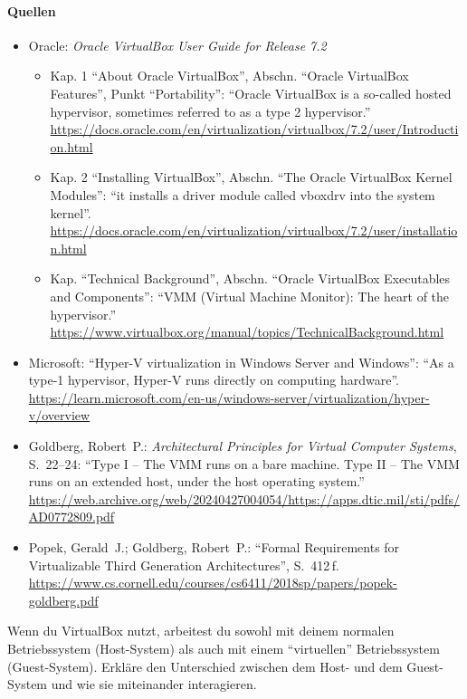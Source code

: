\paragraph{Quellen}
\begin{itemize}[quellen]
  \item Oracle: \emph{Oracle VirtualBox User Guide for Release 7.2}
  \begin{itemize}[nosep]
    \item Kap. 1 \enquote{About Oracle VirtualBox}, Abschn. \enquote{Oracle VirtualBox Features}, Punkt \enquote{Portability}: \enquote{Oracle VirtualBox is a so-called hosted hypervisor, sometimes referred to as a type 2 hypervisor.} \url{https://docs.oracle.com/en/virtualization/virtualbox/7.2/user/Introduction.html}
    \item Kap. 2 \enquote{Installing VirtualBox}, Abschn. \enquote{The Oracle VirtualBox Kernel Modules}: \enquote{it installs a driver module called vboxdrv into the system kernel}. \url{https://docs.oracle.com/en/virtualization/virtualbox/7.2/user/installation.html}
    \item Kap. \enquote{Technical Background}, Abschn. \enquote{Oracle VirtualBox Executables and Components}: \enquote{VMM (Virtual Machine Monitor): The heart of the hypervisor.} \url{https://www.virtualbox.org/manual/topics/TechnicalBackground.html}
  \end{itemize}
  \item Microsoft: \enquote{Hyper-V virtualization in Windows Server and Windows}: \enquote{As a type-1 hypervisor, Hyper-V runs directly on computing hardware}. \url{https://learn.microsoft.com/en-us/windows-server/virtualization/hyper-v/overview}
  \item Goldberg, Robert~P.: \emph{Architectural Principles for Virtual Computer Systems}, S.~22--24: \enquote{Type I -- The VMM runs on a bare machine. Type II -- The VMM runs on an extended host, under the host operating system.} \url{https://web.archive.org/web/20240427004054/https://apps.dtic.mil/sti/pdfs/AD0772809.pdf}
  \item Popek, Gerald~J.; Goldberg, Robert~P.: \enquote{Formal Requirements for Virtualizable Third Generation Architectures}, S.~412\,f. \url{https://www.cs.cornell.edu/courses/cs6411/2018sp/papers/popek-goldberg.pdf}
\end{itemize}

\begin{aufgabe}
Wenn du VirtualBox nutzt, arbeitest du sowohl mit deinem normalen Betriebssystem (Host-System) als auch mit einem \enquote{virtuellen} Betriebssystem (Guest-System). Erkläre den Unterschied zwischen dem Host- und dem Guest-System und wie sie miteinander interagieren.
\end{aufgabe}
\label{sec:hostgast}

